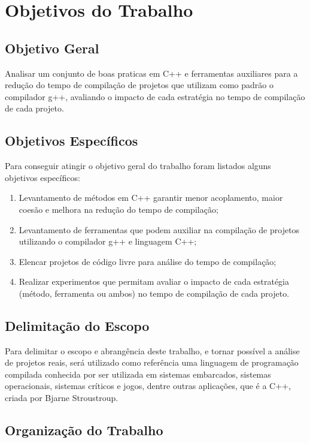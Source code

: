 \section*{Objetivos do Trabalho}

\subsection*{Objetivo Geral}

Analisar um conjunto de boas praticas em C++ e ferramentas auxiliares
 para a redução do tempo de compilação de projetos que utilizam como
 padrão o compilador g++, avaliando o impacto de cada estratégia no
 tempo de compilação de cada projeto.

\subsection*{Objetivos Específicos}

Para conseguir atingir o objetivo geral do trabalho foram listados
 alguns objetivos específicos:


\begin{enumerate}
    \item Levantamento de  métodos em C++ garantir menor acoplamento,
 maior coesão e melhora na redução do tempo de compilação;
    \item Levantamento de ferramentas que podem auxiliar na compilação
 de projetos utilizando o compilador g++ e linguagem C++;
    \item Elencar projetos de código livre para análise do tempo de
 compilação;
    \item Realizar experimentos que permitam avaliar o impacto de cada
 estratégia (método, ferramenta ou ambos) no tempo de compilação de
 cada projeto.
\end{enumerate}

\subsection*{Delimitação do Escopo}

Para delimitar o escopo e abrangência deste trabalho, e tornar possível
 a análise de projetos reais, será utilizado como referência uma linguagem
 de programação compilada conhecida por ser utilizada em sistemas embarcados,
 sistemas operacionais, sistemas críticos e jogos, dentre outras aplicações,
 que é a C++, criada por Bjarne Stroustroup\cite{BjarneC++}.

\subsection*{Organização do Trabalho}

